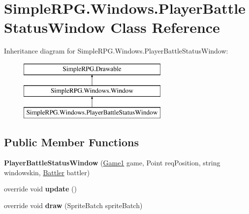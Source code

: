 \hypertarget{class_simple_r_p_g_1_1_windows_1_1_player_battle_status_window}{\section{Simple\+R\+P\+G.\+Windows.\+Player\+Battle\+Status\+Window Class Reference}
\label{class_simple_r_p_g_1_1_windows_1_1_player_battle_status_window}
}
Inheritance diagram for Simple\+R\+P\+G.\+Windows.\+Player\+Battle\+Status\+Window\+:\begin{figure}[H]
\begin{center}
\leavevmode
\includegraphics[height=3.000000cm]{class_simple_r_p_g_1_1_windows_1_1_player_battle_status_window}
\end{center}
\end{figure}
\subsection*{Public Member Functions}
\begin{DoxyCompactItemize}
\item 
\hypertarget{class_simple_r_p_g_1_1_windows_1_1_player_battle_status_window_ae2ad2483a7a871d0d4680c9aa232ee76}{{\bfseries Player\+Battle\+Status\+Window} (\hyperlink{class_simple_r_p_g_1_1_game1}{Game1} game, Point req\+Position, string windowskin, \hyperlink{class_simple_r_p_g_1_1_battler}{Battler} battler)}\label{class_simple_r_p_g_1_1_windows_1_1_player_battle_status_window_ae2ad2483a7a871d0d4680c9aa232ee76}

\item 
\hypertarget{class_simple_r_p_g_1_1_windows_1_1_player_battle_status_window_a24e6f06bae4c4aef79a4a935ee2536ab}{override void {\bfseries update} ()}\label{class_simple_r_p_g_1_1_windows_1_1_player_battle_status_window_a24e6f06bae4c4aef79a4a935ee2536ab}

\item 
\hypertarget{class_simple_r_p_g_1_1_windows_1_1_player_battle_status_window_abbb624620fe13be8267c0ab4ad440d95}{override void {\bfseries draw} (Sprite\+Batch sprite\+Batch)}\label{class_simple_r_p_g_1_1_windows_1_1_player_battle_status_window_abbb624620fe13be8267c0ab4ad440d95}

\end{DoxyCompactItemize}
